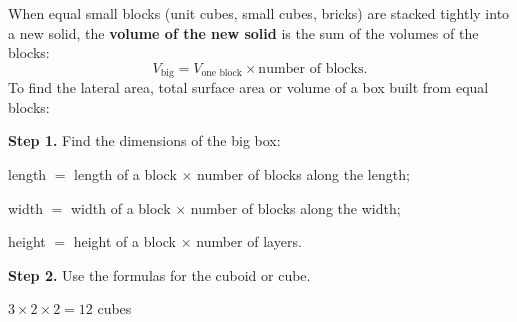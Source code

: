 \providecommand{\xhcuboid}{}\renewcommand{\xhcuboid}[7][tmBlue]{\begin{scope}[shift={({#2+0.5*(#3)},{#4+0.35*(#3)})}]
\filldraw[xhf,fill=#1!22] (0,0) rectangle (#5,#7);
\filldraw[xhf,fill=#1!8] (0,#7)--(#5,#7)--({#5+0.5*(#6)},{#7+0.35*(#6)})--({0.5*(#6)},{#7+0.35*(#6)})--cycle;
\filldraw[xhf,fill=#1!45] (#5,0)--({#5+0.5*(#6)},{0.35*(#6)})--({#5+0.5*(#6)},{#7+0.35*(#6)})--(#5,#7)--cycle;
\end{scope}}
\providecommand{\xhcube}{}\renewcommand{\xhcube}[4][tmBlue]{\xhcuboid[#1]{#2}{#3}{#4}{1}{1}{1}}

\begin{knowbox}
\begin{minipage}[t]{0.62\linewidth}
When equal small blocks (unit cubes, small cubes, bricks) are stacked tightly into a new solid, the \textbf{volume of the new solid} is the sum of the volumes of the blocks:
\[V_{\text{big}}=V_{\text{one block}}\times\text{number of blocks}.\]
To find the lateral area, total surface area or volume of a box built from equal blocks:\par
\smallskip
\textbf{Step 1.} Find the dimensions of the big box:\par
length $=$ length of a block $\times$ number of blocks along the length;\par
width $=$ width of a block $\times$ number of blocks along the width;\par
height $=$ height of a block $\times$ number of layers.\par
\smallskip
\textbf{Step 2.} Use the formulas for the cuboid or cube.
\end{minipage}\hfill
\begin{minipage}[t]{0.34\linewidth}\vspace{4pt}\centering
{}\par\smallskip
{\small $3\times2\times2=12$ cubes}
\end{minipage}
\end{knowbox}

